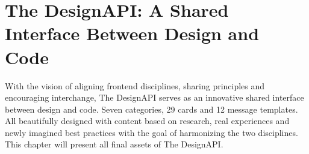 \newpage
\section{The DesignAPI: A Shared Interface Between Design and Code}
With the vision of aligning frontend disciplines, sharing principles and encouraging interchange,
The DesignAPI serves as an innovative shared interface between design and code. Seven categories, 29
cards and 12 message templates. All beautifully designed with content based on research, real
experiences and newly imagined best practices with the goal of harmonizing the two disciplines. This
chapter will present all final assets of The DesignAPI.






